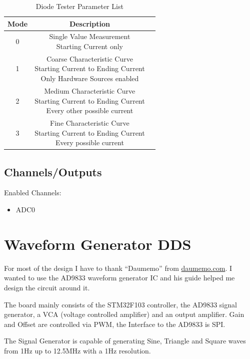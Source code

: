 \begin{table}[H]
    \centering
    \begin{tabular}{|c|c|l|}
        \hline
        \textbf{Mode}   &  \multicolumn{1}{|c|}{\textbf{Description}}\\ \hline \hline
        0   &  \makecell[l]{Single Value Measurement \\ Starting Current only}\\ \hline
		1   &  \makecell[l]{Coarse Characteristic Curve \\ Starting Current to Ending Current \\ Only Hardware Sources enabled}\\ \hline
		2   &  \makecell[l]{Medium Characteristic Curve \\ Starting Current to Ending Current \\ Every other possible current}\\ \hline
		3   &  \makecell[l]{Fine Characteristic Curve \\ Starting Current to Ending Current \\ Every possible current}\\ \hline
    \end{tabular}
	\caption{Diode Tester Parameter List}
\label{tab:Modes-Diode}
\end{table}
\subsection{Channels/Outputs}
Enabled Channels:
\begin{itemize}
	\item ADC0
\end{itemize}
\section{Waveform Generator DDS}
For most of the design I have to thank ``Daumemo'' from \textcolor{blue}{\href{https://daumemo.com}{daumemo.com}}. I wanted to use the AD9833 waveform generator IC and his guide helped me design the circuit around it. 

The board mainly consists of the STM32F103 controller, the AD9833 signal generator, a VCA (voltage controlled amplifier) and an output amplifier. Gain and Offset are controlled via PWM, the Interface to the AD9833 is SPI. 

The Signal Generator is capable of generating Sine, Triangle and Square waves from 1Hz up to 12.5MHz with a 1Hz resolution. 

